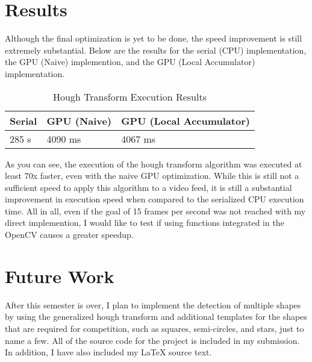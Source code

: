 \documentclass[conference]{IEEEtran}
\begin{document}
\section{Results}
Although the final optimization is yet to be done, the speed improvement is still extremely substantial. Below are the results for the serial (CPU) implementation, the GPU (Naive) implemention, and the GPU (Local Accumulator) implementation. 



\begin{table}
  \caption{Hough Transform Execution Results}
  \label{tab:executionTimes}
  \begin{center}
    \begin{tabular}[c]{l|l|l}
      \hline
      \multicolumn{1}{c|}{\textbf{Serial}} & 
      \multicolumn{1}{c|}{\textbf{GPU (Naive)}} & 
      \multicolumn{1}{c}{\textbf{GPU (Local Accumulator)}} \\
      \hline
      285 s & 4090 ms & 4067 ms\\
      
      \hline
    \end{tabular}
  \end{center}
\end{table}

As you can see, the execution of the hough transform algorithm was executed at least 70x faster, even with the naive GPU optimization. While this is still not a sufficient speed to apply this algorithm to a video feed, it is still a substantial improvement in execution speed when compared to the serialized CPU execution time. All in all, even if the goal of 15 frames per second was not reached with my direct implemention, I would like to test if using functions integrated in the OpenCV causes a greater speedup. 

\section{Future Work}
After this semester is over, I plan to implement the detection of multiple shapes by using the generalized hough transform and additional templates for the shapes that are required for competition, such as squares, semi-circles, and stars, just to name a few. 
All of the source code for the project is included in my submission. 
In addition, I have also included my LaTeX source text. 
\end{document}
